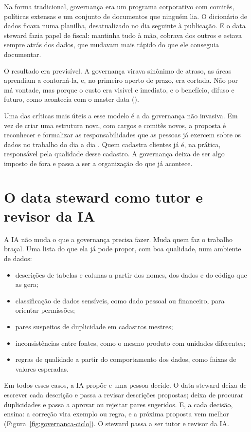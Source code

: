 Na forma tradicional, governança era um programa corporativo com comitês, políticas
extensas e um conjunto de documentos que ninguém lia. O dicionário de dados ficava numa
planilha, desatualizado no dia seguinte à publicação. E o data steward fazia papel de
fiscal: mantinha tudo à mão, cobrava dos outros e estava sempre atrás dos dados, que mudavam
mais rápido do que ele conseguia documentar.

O resultado era previsível. A governança virava sinônimo de atraso, as áreas aprendiam a
contorná-la, e, no primeiro aperto de prazo, era cortada. Não por má vontade, mas porque o
custo era visível e imediato, e o benefício, difuso e futuro, como acontecia com o master
data ().

Uma das críticas mais úteis a esse modelo é a da governança não invasiva. Em vez de criar
uma estrutura nova, com cargos e comitês novos, a proposta é reconhecer e formalizar as
responsabilidades que as pessoas já exercem sobre os dados no trabalho do dia a dia
\parencite{seiner2014}. Quem cadastra clientes já é, na prática, responsável pela qualidade
desse cadastro. A governança deixa de ser algo imposto de fora e passa a ser a organização
do que já acontece.

\section{O data steward como tutor e revisor da IA}
\label{sec:steward-tutor}

A IA não muda o que a governança precisa fazer. Muda quem faz o trabalho braçal. Uma lista
do que ela já pode propor, com boa qualidade, num ambiente de dados:

\begin{itemize}
  \item descrições de tabelas e colunas a partir dos nomes, dos dados e do código que as gera;
  \item classificação de dados sensíveis, como dado pessoal ou financeiro, para orientar
    permissões;
  \item pares suspeitos de duplicidade em cadastros mestres;
  \item inconsistências entre fontes, como o mesmo produto com unidades diferentes;
  \item regras de qualidade a partir do comportamento dos dados, como faixas de valores
    esperadas.
\end{itemize}

Em todos esses casos, a IA propõe e uma pessoa decide. O data steward deixa de escrever
cada descrição e passa a revisar descrições propostas; deixa de procurar duplicidades e
passa a aprovar ou rejeitar pares sugeridos. E, a cada decisão, ensina: a correção vira
exemplo ou regra, e a próxima proposta vem melhor (Figura~\ref{fig:governanca-ciclo}). O
steward passa a ser tutor e revisor da IA.

